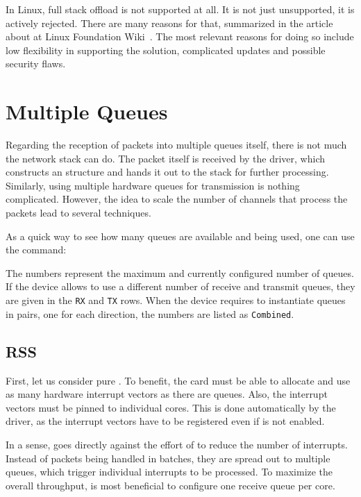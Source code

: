 In Linux, full  stack offload is not supported at all. It is not just
unsupported, it is actively rejected. There are many reasons for that,
summarized in the article about  at Linux Foundation Wiki~\cite{lf-toe}.
The most relevant reasons for doing so include low flexibility in supporting
the solution, complicated updates and possible security flaws.

\section{Multiple Queues}

Regarding the reception of packets into multiple queues itself, there is not much
the network stack can do. The packet itself is received by the  driver,
which constructs an \skb{} structure and hands it out to the stack for further
processing. Similarly, using multiple hardware queues for transmission is
nothing complicated. However, the idea to scale the number of channels that
process the packets lead to several techniques.

As a quick way to see how many queues are available and  being used, one can
use the  command:


The numbers represent the maximum and currently configured number of queues. If the
device allows to use a different number of receive and transmit queues, they
are given in the \texttt{RX} and \texttt{TX} rows. When the device requires
to instantiate queues in pairs, one for each direction, the numbers are listed as
\texttt{Combined}.

\subsection{\acrlong{RSS}}

First, let us consider pure . To benefit, the card must
be able to allocate and use as many hardware interrupt vectors as there are queues. Also,
the interrupt vectors must be pinned to individual  cores. This is done
automatically by the  driver, as the interrupt vectors have to be
registered even if  is not enabled.

In a sense,  goes directly against the effort of  to reduce the number of
interrupts. Instead of packets being handled in batches, they are spread out to
multiple queues, which trigger individual interrupts to be processed.
To maximize the overall throughput, is most beneficial to configure one receive queue
per  core.

